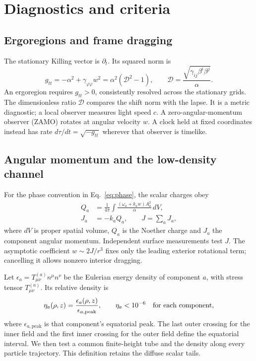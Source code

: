 \documentclass[10pt,twocolumn,floatfix,aps,prd,superscriptaddress,nofootinbib]{revtex4-2}
\begin{document}
\section{Diagnostics and criteria}
\label{sec:diagnostics}

\subsection{Ergoregions and frame dragging}

The stationary Killing vector is $\partial_t$. Its squared norm is
\begin{equation}
 g_{tt}=-\alpha^2+\gamma_{\varphi\varphi}w^2
       =\alpha^2(\mathcal{D}^2-1),\qquad
 \mathcal{D}=\frac{\sqrt{\gamma_{ij}\beta^i\beta^j}}{\alpha}.
 \label{eq:ergo}
\end{equation}
An ergoregion requires $g_{tt}>0$, consistently resolved across the stationary
grids. The dimensionless ratio $\mathcal{D}$ compares the shift norm with the
lapse. It is a metric diagnostic; a local observer measures light speed $c$.
A zero-angular-momentum observer (ZAMO) rotates at angular velocity $w$.
A clock held at fixed coordinates instead has rate
$d\tau/dt=\sqrt{-g_{tt}}$ wherever that observer is timelike.

\subsection{Angular momentum and the low-density channel}

For the phase convention in Eq.~\eqref{eq:phase}, the scalar charges obey
\begin{equation}
 \begin{split}
 Q_a&=\frac{1}{4\pi}\int
       \frac{(\omega_a+k_aw)A_a^2}{\alpha}\,dV,\\
 J_a&=-k_aQ_a,\qquad J=\sum_aJ_a,
 \end{split}
 \label{eq:charges}
\end{equation}
where $dV$ is proper spatial volume, $Q_a$ is the Noether charge and $J_a$
the component angular momentum. Independent surface measurements test $J$.
The asymptotic coefficient $w\sim2J/r^3$ fixes only the leading exterior
rotational term; cancelling it allows nonzero interior dragging.

Let $\epsilon_a=T^{(a)}_{\mu\nu}n^\mu n^\nu$ be the Eulerian energy density
of component $a$, with stress tensor $T^{(a)}_{\mu\nu}$. Its relative density is
\begin{equation}
 \eta_a(\rho,z)=\frac{\epsilon_a(\rho,z)}{\epsilon_{a,\mathrm{peak}}},
 \qquad \eta_a<10^{-6}\quad\hbox{for each component},
 \label{eq:density}
\end{equation}
where $\epsilon_{a,\mathrm{peak}}$ is that component's equatorial peak.
The last outer crossing for the inner field and the first inner crossing for
the outer field define the equatorial interval. We then test a common
finite-height tube and the density along every particle trajectory.
This definition retains the diffuse scalar tails.
\end{document}
